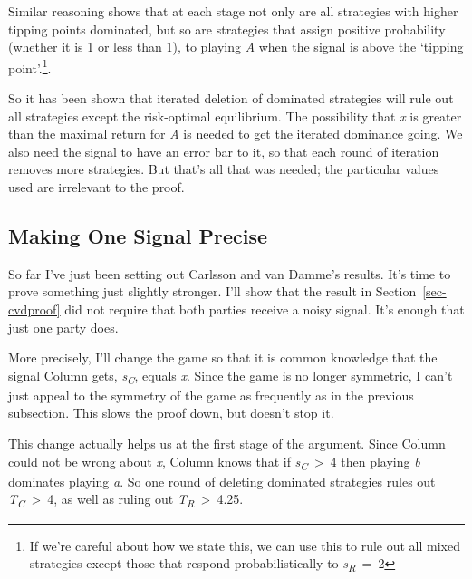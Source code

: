 \documentclass[
  10pt,
  letterpaper,
  twoside]{scrbook}
\begin{document}
Similar reasoning shows that at each stage not only are all strategies
with higher tipping points dominated, but so are strategies that assign
positive probability (whether it is 1 or less than 1), to playing
\emph{A} when the signal is above the `tipping point'.\footnote{If we're
  careful about how we state this, we can use this to rule out all mixed
  strategies except those that respond probabilistically to
  \emph{s\textsubscript{R}}~=~2}.

So it has been shown that iterated deletion of dominated strategies will
rule out all strategies except the risk-optimal equilibrium. The
possibility that \emph{x} is greater than the maximal return for
\emph{A} is needed to get the iterated dominance going. We also need the
signal to have an error bar to it, so that each round of iteration
removes more strategies. But that's all that was needed; the particular
values used are irrelevant to the proof.

\subsection{Making One Signal Precise}\label{sec-perfectri}

So far I've just been setting out Carlsson and van Damme's results. It's
time to prove something just slightly stronger. I'll show that the
result in Section~\ref{sec-cvdproof} did not require that both parties
receive a noisy signal. It's enough that just one party does.

More precisely, I'll change the game so that it is common knowledge that
the signal Column gets, \emph{s\textsubscript{C}}, equals \emph{x}.
Since the game is no longer symmetric, I can't just appeal to the
symmetry of the game as frequently as in the previous subsection. This
slows the proof down, but doesn't stop it.

This change actually helps us at the first stage of the argument. Since
Column could not be wrong about \emph{x}, Column knows that if
\emph{s\textsubscript{C}}~\textgreater~4 then playing \emph{b} dominates
playing \emph{a}. So one round of deleting dominated strategies rules
out \emph{T\textsubscript{C}}~\textgreater~4, as well as ruling out
\emph{T\textsubscript{R}}~\textgreater~4.25.
\end{document}
